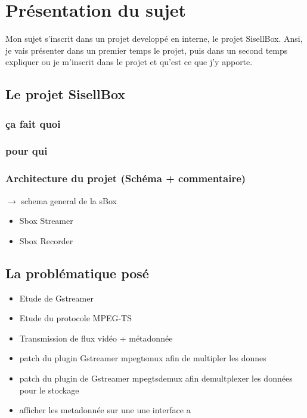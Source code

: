 \section{Présentation du sujet}
Mon sujet s'inscrit dans un projet developpé en interne, le projet SisellBox. Ansi,
je vais présenter dans un premier temps le projet, puis dans un second temps
expliquer ou je m'inscrit dans le projet et qu'est ce que j'y apporte.

\subsection{Le projet SisellBox}
  \subsubsection{ça fait quoi}
  \subsubsection{pour qui}
  \subsubsection{Architecture du projet (Schéma + commentaire)}
  $\rightarrow$ schema general de la sBox
  \begin{itemize}
    \item Sbox Streamer
    \item Sbox Recorder
  \end{itemize}

\subsection{La problématique posé}
\begin{itemize}
  \item Etude de Gstreamer
  \item Etude du protocole MPEG-TS
  \item Transmission de flux vidéo + métadonnée
  \item patch du plugin Gstreamer mpegtsmux afin de  multipler les donnes
  \item patch du plugin de Gstreamer mpegtsdemux afin demultplexer les données pour le stockage
  \item afficher les metadonnée sur une une interface a
\end{itemize}
